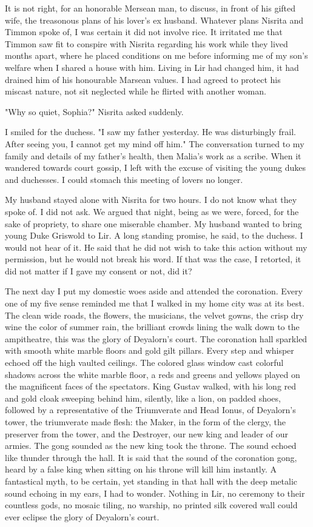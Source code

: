 \documentclass{article}
\begin{document}
It is not right, for an honorable Mersean man, to discuss, in front of his gifted wife, the treasonous plans of his lover's ex husband. Whatever plans Nisrita and Timmon spoke of, I was certain it did not involve rice. It irritated me that Timmon saw fit to conspire with Nisrita regarding his work while they lived months apart, where he placed conditions on me before informing me of my son's welfare when I shared a house with him. Living in Lir had changed him, it had drained him of his honourable Marsean values. I had agreed to protect his miscast nature, not sit neglected while he flirted with another woman.

"Why so quiet, Sophia?" Nisrita asked suddenly.

I smiled for the duchess. "I saw my father yesterday. He was disturbingly frail. After seeing you, I cannot get my mind off him." The conversation turned to my family and details of my father's health, then Malia's work as a scribe. When it wandered towards court gossip, I left with the excuse of visiting the young dukes and duchesses. I could stomach this meeting of lovers no longer.

My husband stayed alone with Nisrita for two hours. I do not know what they spoke of. I did not ask. We argued that night, being as we were, forced, for the sake of propriety, to share one miserable chamber. My husband wanted to bring young Duke Griswold to Lir. A long standing promise, he said, to the duchess. I would not hear of it. He said that he did not wish to take this action without my permission, but he would not break his word. If that was the case, I retorted, it did not matter if I gave my consent or not, did it?

The next day I put my domestic woes aside and attended the coronation. Every one of my five sense reminded me that I walked in my home city was at its best. The clean wide roads, the flowers, the musicians, the velvet gowns, the crisp dry wine the color of summer rain, the brilliant crowds lining the walk down to the ampitheatre, this was the glory of Deyalorn's court. The coronation hall sparkled with smooth white marble floors and gold gilt pillars. Every step and whisper echoed off the high vaulted ceilings. The colored glass window cast colorful shadows across the white marble floor, a reds and greens and yellows played on the magnificent faces of the spectators. King Gustav walked, with his long red and gold cloak sweeping behind him, silently, like a lion, on padded shoes, followed by a representative of the Triumverate and Head Ionus, of Deyalorn's tower, the triumverate made flesh: the Maker, in the form of the clergy, the preserver from the tower, and the Destroyer, our new king and leader of our armies. The gong sounded as the new king took the throne. The sound echoed like thunder through the hall. It is said that the sound of the coronation gong, heard by a false king when sitting on his throne will kill him instantly. A fantastical myth, to be certain, yet standing in that hall with the deep metalic sound echoing in my ears, I had to wonder. Nothing in Lir, no ceremony to their countless gods, no mosaic tiling, no warship, no printed silk covered wall could ever eclipse the glory of Deyalorn's court. 
\end{document}
